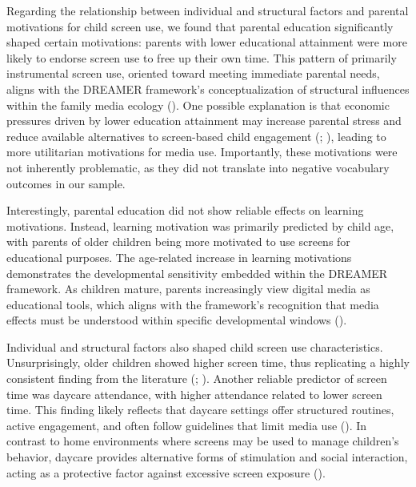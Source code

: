 \documentclass[
  man,
  floatsintext,
  longtable,
  nolmodern,
  notxfonts,
  notimes,
  colorlinks=true,linkcolor=blue,citecolor=blue,urlcolor=blue]{apa7}
\begin{document}
Regarding the relationship between individual and structural factors and
parental motivations for child screen use, we found that parental
education significantly shaped certain motivations: parents with lower
educational attainment were more likely to endorse screen use to free up
their own time. This pattern of primarily instrumental screen use,
oriented toward meeting immediate parental needs, aligns with the
DREAMER framework's conceptualization of structural influences within
the family media ecology
(). One
possible explanation is that economic pressures driven by lower
education attainment may increase parental stress and reduce available
alternatives to screen-based child engagement
(;
), leading to more utilitarian motivations for media use.
Importantly, these motivations were not inherently problematic, as they
did not translate into negative vocabulary outcomes in our sample.

Interestingly, parental education did not show reliable effects on
learning motivations. Instead, learning motivation was primarily
predicted by child age, with parents of older children being more
motivated to use screens for educational purposes. The age-related
increase in learning motivations demonstrates the developmental
sensitivity embedded within the DREAMER framework. As children mature,
parents increasingly view digital media as educational tools, which
aligns with the framework's recognition that media effects must be
understood within specific developmental windows
().

Individual and structural factors also shaped child screen use
characteristics. Unsurprisingly, older children showed higher screen
time, thus replicating a highly consistent finding from the literature
(;
). Another
reliable predictor of screen time was daycare attendance, with higher
attendance related to lower screen time. This finding likely reflects
that daycare settings offer structured routines, active engagement, and
often follow guidelines that limit media use
(). In contrast to home environments where screens may be used to
manage children's behavior, daycare provides alternative forms of
stimulation and social interaction, acting as a protective factor
against excessive screen exposure
().
\end{document}
